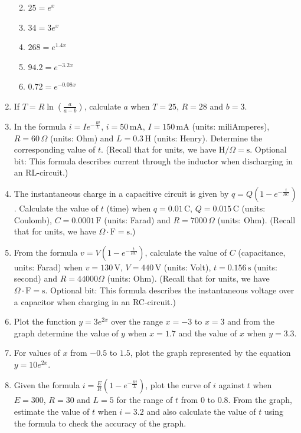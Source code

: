 \documentclass[
  12pt,
  oneside]{book}
\providecommand{\tightlist}{%
  \setlength{\itemsep}{0pt}\setlength{\parskip}{0pt}}
\theoremstyle{definition}
\theoremstyle{definition}
\theoremstyle{definition}
\theoremstyle{definition}
\theoremstyle{remark}
\begin{document}
\begin{enumerate}
  \begin{enumerate}
  \def\labelenumii{\roman{enumii})}
  \tightlist
  \item
    \(25=e^x\)
  \item
    \(34=3e^x\)
  \item
    \(268=e^{1.4x}\)
  \item
    \(94.2=e^{-3.2x}\)
  \item
    \(0.72=e^{-0.08x}\)
  \end{enumerate}
\item
  If \(T=R\ln\left(\frac{a}{a-b}\right)\), calculate \(a\) when \(T=25\), \(R=28\) and \(b=3\).
\item
  In the formula \(i=Ie^{-\frac{Rt}{L}}\), \(i=50\,\mathrm{mA}\), \(I=150\,\mathrm{mA}\) (units: miliAmperes), \(R=60\,\Omega\) (units: Ohm) and \(L=0.3\,\mathrm{H}\) (units: Henry). Determine the corresponding value of \(t\). (Recall that for units, we have \(\mathrm{H}/\Omega = \mathrm{s}\). Optional bit: This formula describes current through the inductor when discharging in an RL-circuit.)
\item
  The instantaneous charge in a capacitive circuit is given by \(q=Q\left(1-e^{-\frac{t}{RC}}\right)\). Calculate the value of \(t\) (time) when \(q=0.01\,\mathrm{C}\), \(Q=0.015\,\mathrm{C}\) (units: Coulomb), \(C=0.0001\,\mathrm{F}\) (units: Farad) and \(R=7000\,\Omega\) (units: Ohm). (Recall that for units, we have \(\Omega\cdot\mathrm{F}=\mathrm{s}\).)
\item
  From the formula \(v=V\left(1-e^{-\frac{t}{RC}}\right)\), calculate the value of \(C\) (capacitance, units: Farad) when \(v=130\,\mathrm{V}\), \(V=440\,\mathrm{V}\) (units: Volt), \(t=0.156\,\mathrm{s}\) (units: second) and \(R=44000\Omega\) (units: Ohm). (Recall that for units, we have \(\Omega\cdot\mathrm{F}=\mathrm{s}\). Optional bit: This formula describes the instantaneous voltage over a capacitor when charging in an RC-circuit.)
\item
  Plot the function \(y = 3e^{2x}\) over the range \(x = -3\) to \(x = 3\) and from the graph determine the value
  of \(y\) when \(x = 1.7\) and the value of \(x\) when \(y = 3.3\).
\item
  For values of \(x\) from \(-0.5\) to \(1.5\), plot the graph represented by the equation \(y = 10e^{2x}\).
\item
  Given the formula \(i=\frac{E}{R}\left(1-e^{-\frac{Rt}{L}}\right)\), plot the curve of \(i\) against \(t\) when \(E=300\), \(R=30\) and \(L=5\) for the range of \(t\) from \(0\) to \(0.8\). From the graph, estimate the value of \(t\) when \(i=3.2\) and also calculate the value of \(t\) using the formula to check the accuracy of the graph.

\end{enumerate}
\end{document}

